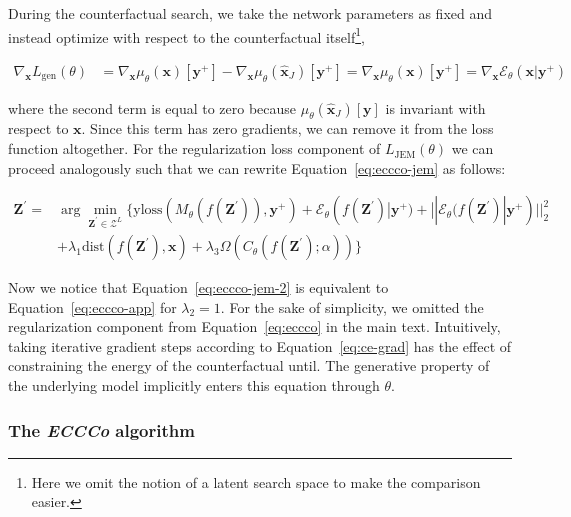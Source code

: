 During the counterfactual search, we take the network parameters as fixed and instead optimize with respect to the counterfactual itself\footnote{Here we omit the notion of a latent search space to make the comparison easier.},

\begin{equation}\label{eq:ce-grad}
  \begin{aligned}
    \nabla_{\mathbf{x}}L_{\text{gen}}(\theta) &= \nabla_{\mathbf{x}}\mu_{\theta}(\mathbf{x})[\mathbf{y}^+]- \nabla_{\mathbf{x}}\mu_{\theta}(\hat{\mathbf{x}}_{J})[\mathbf{y}^+]=\nabla_{\mathbf{x}}\mu_{\theta}(\mathbf{x})[\mathbf{y}^+]=\nabla_{\mathbf{x}}\mathcal{E}_{\theta}(\mathbf{x}|\mathbf{y}^+)
  \end{aligned}
\end{equation}

where the second term is equal to zero because $\mu_{\theta}(\hat{\mathbf{x}}_{J})[\mathbf{y}]$ is invariant with respect to $\mathbf{x}$. Since this term has zero gradients, we can remove it from the loss function altogether. For the regularization loss component of $L_{\text{JEM}}(\theta)$ we can proceed analogously such that we can rewrite Equation~\ref{eq:eccco-jem} as follows:

\begin{equation} \label{eq:eccco-jem-2}
  \begin{aligned}
  \mathbf{Z}^\prime =& \arg \min_{\mathbf{Z}^\prime \in \mathcal{Z}^L} \{  {\text{yloss}(M_{\theta}(f(\mathbf{Z}^\prime)),\mathbf{y}^+) + \mathcal{E}_{\theta}(f(\mathbf{Z}^\prime)|\mathbf{y}^+) + || \mathcal{E}_{\theta}(f(\mathbf{Z}^\prime)|\mathbf{y}^+) ||_2^2} \\ &+ \lambda_{1} {\text{dist}(f(\mathbf{Z}^\prime),\mathbf{x}) }  + \lambda_3 \Omega(C_{\theta}(f(\mathbf{Z}^\prime);\alpha)) \} 
  \end{aligned} 
\end{equation}

Now we notice that Equation~\ref{eq:eccco-jem-2} is equivalent to Equation~\ref{eq:eccco-app} for $\lambda_2=1$. For the sake of simplicity, we omitted the regularization component from Equation~\ref{eq:eccco} in the main text. Intuitively, taking iterative gradient steps according to Equation~\ref{eq:ce-grad} has the effect of constraining the energy of the counterfactual until. The generative property of the underlying model implicitly enters this equation through $\theta$.

\subsubsection{The \textit{ECCCo} algorithm}

